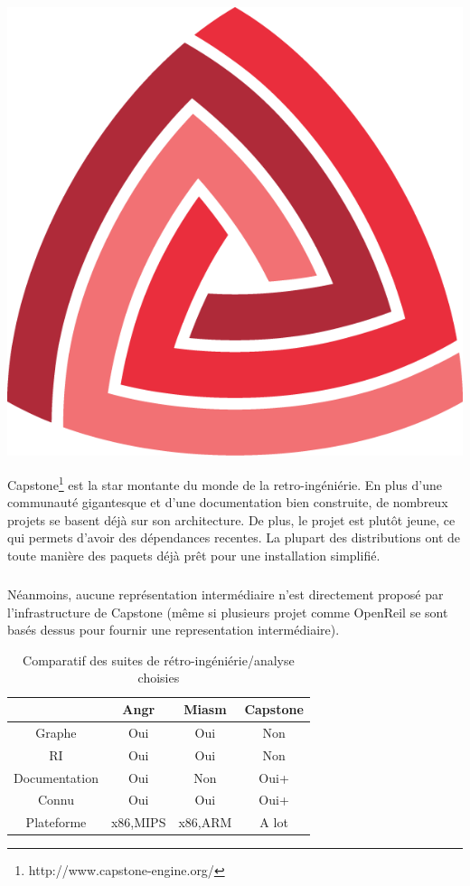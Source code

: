 \begin{center}
\includegraphics[scale=0.3]{capstone.png}
\end{center}
Capstone\footnote{http://www.capstone-engine.org/} est la star montante du monde de la retro-ingéniérie. En plus d'une communauté gigantesque et d'une
documentation bien construite, de nombreux projets se basent déjà sur son architecture. De plus, le projet est plutôt jeune, ce qui permets d'avoir des
dépendances recentes. La plupart des distributions ont de toute manière des paquets déjà prêt pour une installation simplifié.
\subparagraph{}
Néanmoins, aucune représentation intermédiaire n'est directement proposé par l'infrastructure de Capstone (même si plusieurs projet comme OpenReil se sont basés
dessus pour fournir une representation intermédiaire).



\begin{table}[h]
    \centering
    \caption{Comparatif des suites de rétro-ingéniérie/analyse choisies}
    \label{itd}
    \begin{tabular}{c|c|c|c}
                      & Angr     & Miasm   & Capstone \\
        \hline
        Graphe        & Oui      & Oui     & Non      \\
        \hline
        RI            & Oui      & Oui     & Non      \\
        \hline
        Documentation & Oui      & Non     & Oui+     \\
        \hline
        Connu         & Oui      & Oui     & Oui+     \\
        \hline
        Plateforme    & x86,MIPS & x86,ARM & A lot
    \end{tabular}
\end{table}

